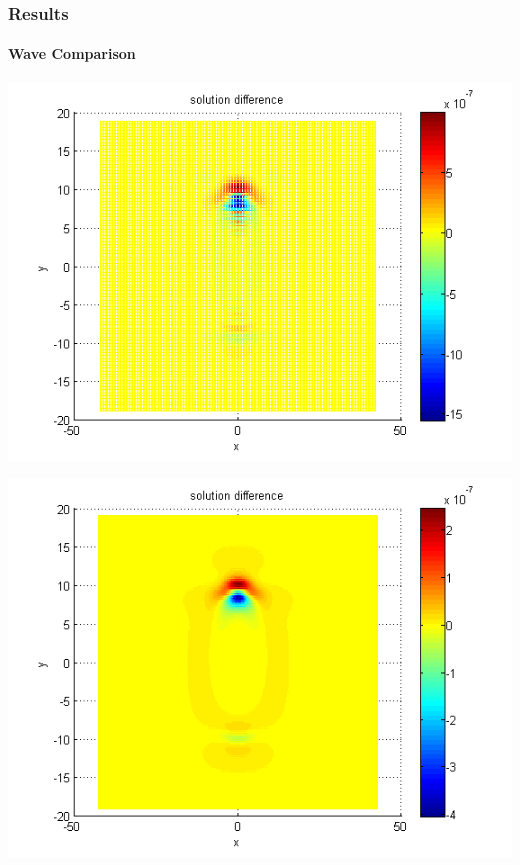 \documentclass{beamer}
\begin{document}
\begin{frame}
\frametitle{Results}
\framesubtitle{Wave Comparison}
\begin{center}\vspace{0.4cm}
	\begin{minipage}[b]{0.32\linewidth}
		\includegraphics[width=\linewidth]{../amitans/figures/compare_128_bt1_c09_h040.png}
	\end{minipage}	
	\begin{minipage}[b]{0.32\linewidth}
		\includegraphics[width=\linewidth]{../amitans/figures/compare_128_bt1_c09_h020.png}
	\end{minipage}	
	\begin{minipage}[b]{0.32\linewidth}

\end{minipage}
\end{center}
\end{frame}
\end{document}
